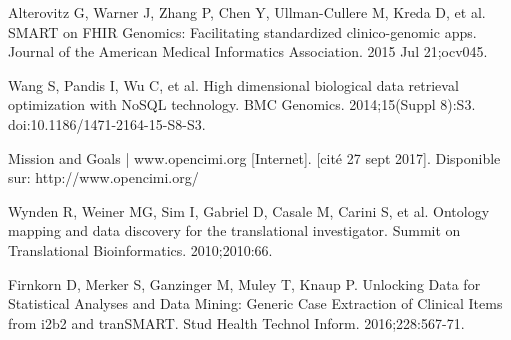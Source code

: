 \documentclass{amia}
\begin{document}
\begin{thebibliography}{1}
Alterovitz G, Warner J, Zhang P, Chen Y, Ullman-Cullere M, Kreda D, et al. SMART on FHIR Genomics: Facilitating standardized clinico-genomic apps. Journal of the American Medical Informatics Association. 2015 Jul 21;ocv045. 

Wang S, Pandis I, Wu C, et al. High dimensional biological data retrieval optimization with NoSQL technology. BMC Genomics. 2014;15(Suppl 8):S3. doi:10.1186/1471-2164-15-S8-S3.

Mission and Goals | www.opencimi.org [Internet]. [cité 27 sept 2017]. Disponible sur: http://www.opencimi.org/

Wynden R, Weiner MG, Sim I, Gabriel D, Casale M, Carini S, et al. Ontology mapping and data discovery for the translational investigator. Summit on Translational Bioinformatics. 2010;2010:66. 

Firnkorn D, Merker S, Ganzinger M, Muley T, Knaup P. Unlocking Data for Statistical Analyses and Data Mining: Generic Case Extraction of Clinical Items from i2b2 and tranSMART. Stud Health Technol Inform. 2016;228:567-71.

\end{thebibliography}
\end{document}

